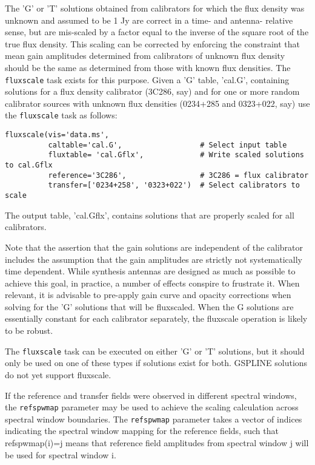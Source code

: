The 'G' or 'T' solutions obtained from calibrators for which the flux
density was unknown and assumed to be 1 Jy are correct in a time- and
antenna- relative sense, but are mis-scaled by a factor equal to the
inverse of the square root of the true flux density.  This scaling can
be corrected by enforcing the constraint that mean gain amplitudes
determined from calibrators of unknown flux density should be the same
as determined from those with known flux densities.  The {\tt
fluxscale} task exists for this purpose.  Given a 'G' table, 'cal.G',
containing solutions for a flux density calibrator (3C286, say) and
for one or more random calibrator sources with unknown flux densities
(0234+285 and 0323+022, say) use the {\tt fluxscale} task as follows:

\small
\begin{verbatim}
fluxscale(vis='data.ms',
          caltable='cal.G',                  # Select input table
          fluxtable= 'cal.Gflx',             # Write scaled solutions to cal.Gflx
          reference='3C286',                 # 3C286 = flux calibrator
          transfer=['0234+258', '0323+022')  # Select calibrators to scale
\end{verbatim}
\normalsize

The output table, 'cal.Gflx', contains solutions that are properly scaled
for all calibrators.

Note that the assertion that the gain solutions are independent of the
calibrator includes the assumption that the gain amplitudes are
strictly not systematically time dependent.  While synthesis antennas
are designed as much as possible to achieve this goal, in practice, a
number of effects conspire to frustrate it.  When relevant, it is
advisable to pre-apply gain curve and opacity corrections when solving
for the 'G' solutions that will be fluxscaled.  When the G solutions
are essentially constant for each calibrator separately, the fluxscale
operation is likely to be robust.

The {\tt fluxscale} task can be executed on either 'G' or 'T'
solutions, but it should only be used on one of these types if
solutions exist for both.  GSPLINE solutions do not yet support
fluxscale.

If the reference and transfer fields were observed in different
spectral windows, the {\tt refspwmap} parameter may be used
to achieve the scaling calculation across spectral window boundaries.
The {\tt refspwmap} parameter takes a vector of indices
indicating the spectral window mapping for the reference fields,
such that refspwmap(i)=j means that reference field amplitudes
from spectral window j will be used for spectral window i.

